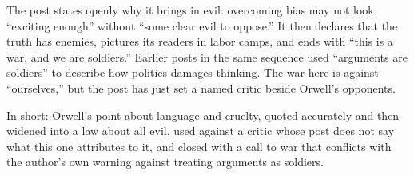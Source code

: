 \begin{afterword}
The post states openly why it brings in evil: overcoming bias may not look ``exciting enough'' without ``some clear evil to oppose.'' It then declares that the truth has enemies, pictures its readers in labor camps, and ends with ``this is a war, and we are soldiers.'' Earlier posts in the same sequence used ``arguments are soldiers'' to describe how politics damages thinking. The war here is against ``ourselves,'' but the post has just set a named critic beside Orwell's opponents.

In short: Orwell's point about language and cruelty, quoted accurately and then widened into a law about all evil, used against a critic whose post does not say what this one attributes to it, and closed with a call to war that conflicts with the author's own warning against treating arguments as soldiers.
\end{afterword}
